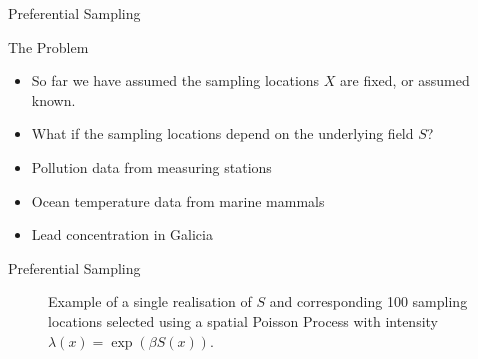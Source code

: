 \documentclass{beamer}
\begin{document}
\begin{frame}{Preferential Sampling}
\begin{block}{The Problem}
\begin{itemize}
\item So far we have assumed the sampling locations $X$ are fixed, or assumed known.
\item What if the sampling locations depend on the underlying field $S$?
\end{itemize}
\end{block}

\begin{example}
\begin{itemize}
\item Pollution data from measuring stations
\item Ocean temperature data from marine mammals
\item Lead concentration in Galicia
\end{itemize}
\end{example}
\end{frame}

\begin{frame}{Preferential Sampling}

\begin{figure}
\centering
\caption{Example of a single realisation of $S$ and corresponding 100 sampling locations selected using a spatial Poisson Process with intensity $\lambda(x)=\exp(\beta S(x))$.\label{fig:PrefSimPlot}}
\end{figure}

\end{frame}
\end{document}
